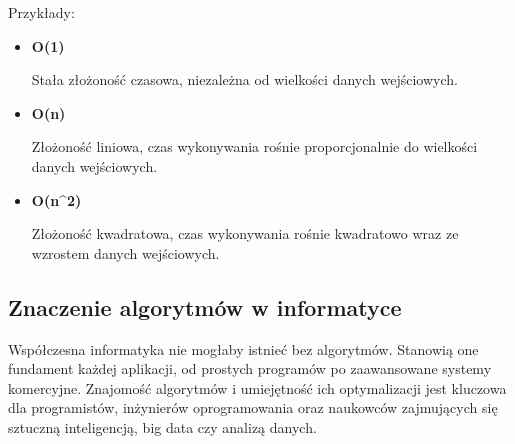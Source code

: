 Przykłady:
\begin{itemize}
    \item{\textbf{O(1)}}

    Stała złożoność czasowa, niezależna od wielkości danych wejściowych.
    
    \item{\textbf{O(n)}}

    Złożoność liniowa, czas wykonywania rośnie proporcjonalnie do wielkości danych wejściowych.
    
    \item{\textbf{O(n^{2})}}

    Złożoność kwadratowa, czas wykonywania rośnie kwadratowo wraz ze wzrostem danych wejściowych.
    
\end{itemize}

\subsection{Znaczenie algorytmów w informatyce} Współczesna informatyka nie mogłaby istnieć bez algorytmów. Stanowią one fundament każdej aplikacji, od prostych programów po zaawansowane systemy komercyjne. Znajomość algorytmów i umiejętność ich optymalizacji jest kluczowa dla programistów, inżynierów oprogramowania oraz naukowców zajmujących się sztuczną inteligencją, big data czy analizą danych.